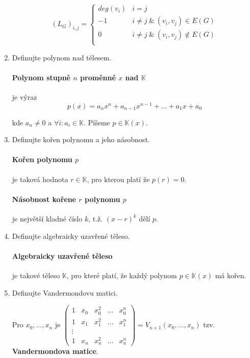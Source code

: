 \documentclass[10pt,a4paper]{article}
\theoremstyle{plain}
\begin{document}
\begin{enumerate}
\[ (L_G)_{i,j} = \begin{cases}  deg(v_i) & i = j  \\ 
								-1 & i \neq j \ \&\  (v_i, v_j) \in E(G) \\ 
								0  & i \neq j \ \&\  (v_i, v_j) \notin E(G) \\ \end{cases} \]

\item Definujte polynom nad tělesem.

\paragraph{Polynom stupně $n$ proměnné $x$ nad $\mathbb{K}$} je výraz
\[ p(x) = a_nx^n + a_{n-1}x^{n-1} + ... + a_1x + a_0\]

kde $a_n \neq 0$ a $\forall i: a_i \in \mathbb{K}$. Píšeme $p \in \mathbb{K}(x)$.

\item Definujte kořen polynomu a jeho násobnost.

\paragraph{Kořen polynomu $p$} je taková hodnota $r \in \mathbb{K}$, pro kterou platí že $p(r) = 0$.

\paragraph{Násobnost kořene $r$ polynomu $p$} je největší kladné číslo $k$, t.ž. $(x-r)^k$ dělí $p$.

\item Definujte algebraicky uzavřené těleso.

\paragraph{Algebraicky uzavřené těleso} je takové těleso $\mathbb{K}$, pro které platí, že každý polynom $p \in \mathbb{K}(x)$ má kořen.

\item Definujte Vandermondovu matici.


Pro $x_0, ..., x_n$ je $\begin{pmatrix}
1 & x_0 & x_0^2 & ... & x_0^{n} \\
1 & x_1 & x_1^2 & ... & x_1^{n} \\
\vdots &&& \\
1 & x_n & x_n^2 & ... & x_n^{n	} 
\end{pmatrix} = V_{n+1}(x_0, ..., x_n)$ tzv. \textbf{Vandermondova matice}.


\end{enumerate}
\end{document}
